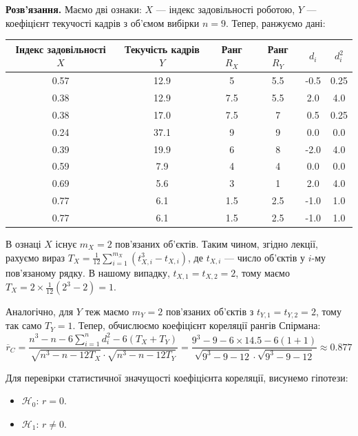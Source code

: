 \documentclass{../hw_template}
\begin{document}
\textbf{Розв'язання.} Маємо дві ознаки: $X$ --- індекс задовільності роботою,
$Y$ --- коефіцієнт текучості кадрів з об'ємом вибірки $n=9$. Тепер, ранжуємо дані:
\begin{center}
    \begin{tabular}{|c|c|c|c|c|c|}
        \hline
        \textbf{Індекс задовільності $X$} & \textbf{Текучість кадрів $Y$} & \textbf{Ранг $R_X$} & \textbf{Ранг $R_Y$} & $d_i$ & $d_i^2$ \\
        \hline
        0.57 & 12.9 & 5 &   5.5 & -0.5 & 0.25 \\
        0.38 & 12.9 & 7.5 & 5.5 & 2.0 & 4.0 \\
        0.38 & 17.0 & 7.5 & 7 &   0.5 & 0.25 \\
        0.24 & 37.1 & 9 &   9 &   0.0 & 0.0 \\
        0.39 & 19.9 & 6 &   8 &  -2.0& 4.0 \\
        0.59 & 7.9 & 4 &    4 & 0.0 & 0.0 \\
        0.69 & 5.6 & 3 &    1 & 2.0 & 4.0 \\
        0.77 & 6.1 & 1.5 &  2.5 & -1.0 & 1.0 \\
        0.77 & 6.1 & 1.5 &  2.5 & -1.0 & 1.0 \\
        \hline
    \end{tabular}
\end{center}

В ознаці $X$ існує $m_X = 2$ пов'язаних об'єктів. Таким чином, згідно лекції,
рахуємо вираз $T_X = \frac{1}{12}\sum_{i=1}^{m_X}(t_{X,i}^3 - t_{X,i})$, де
$t_{X,i}$ --- число об'єктів у $i$-му пов'язаному рядку. В нашому випадку,
$t_{X,1} = t_{X,2} = 2$, тому маємо $T_X = 2\times
\frac{1}{12}\left(2^3-2\right)=1$.

Аналогічно, для $Y$ теж маємо $m_Y=2$ пов'язаних об'єктів з $t_{Y,1} = t_{Y,2} = 2$,
тому так само $T_Y = 1$. Тепер, обчислюємо коефіцієнт кореляції рангів Спірмана:
\begin{equation*}
    \overline{r}_C = \frac{n^3 - n - 6\sum_{i=1}^n d_i^2 - 6(T_X+T_Y)}{\sqrt{n^3-n-12T_X}\cdot \sqrt{n^3-n-12T_Y}}
    = \frac{9^3 - 9 - 6 \times 14.5 - 6(1+1)}{\sqrt{9^3-9-12} \cdot \sqrt{9^3-9-12}} \approx 0.877
\end{equation*}

Для перевірки статистичної значущості коефіцієнта кореляції, висунемо гіпотези:
\begin{itemize}
    \item $\mathcal{H}_0$: $r=0$.
    \item $\mathcal{H}_1$: $r\neq 0$.
\end{itemize}
\end{document}
